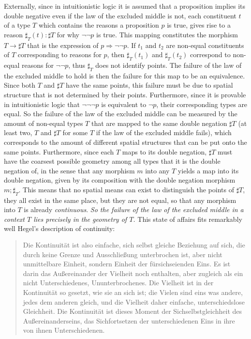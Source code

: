 \documentclass{article}
\begin{document}
Externally, since in intuitionistic logic it is assumed that a proposition implies its double negative even 
if the law of the excluded middle is not, each constituent $t$ of a type $T$ which contains the reasons a 
proposition $p$ is true, gives rise to a reason $\sharp_T (t):\sharp T$ for why $\neg\neg p$ is true. This 
mapping constitutes the morphism $T \rightarrow \sharp T$ that is the expression of $p\Rightarrow\neg\neg p$.
If $t_1$ and $t_2$ are non-equal constituents of $T$ corresponding to reasons for $p$, then $\sharp_T (t_1)$
and $\sharp_T (t_2)$ correspond to non-equal reasons for $\neg\neg p$, thus $\sharp_T$ does not identify 
points. The failure of the law of the excluded middle to hold is then the failure for this map to be an equivalence. 
Since both $T$ and $\sharp T$ have the same points, this failure must be due to spatial structure that is not
determined by their points. Furthermore, since it is provable in intuitionistic logic that $\neg\neg\neg p$ 
is equivalent to $\neg p$, their corresponding types are equal. So the failure of the law of the excluded middle
can be measured by the amount of non-equal types $T$ that are mapped to the same double negation $\sharp T$ 
(at least two, $T$ and $\sharp T$ for some $T$ if the law of the excluded middle fails), which corresponds to
the amount of different spatial structures that can be put onto the same points. Furthermore, since each 
$T$ maps to its double negation, $\sharp T$ must have the coarsest possible geometry among all types that it is the double negation of, in the sense that any morphism 
$m$ into any $T$ yields a map into its double negation,
given by its composition with the double negation morphism $m;\sharp_T$. This means that no spatial means can
exist to distinguish the points of $\sharp T$, they all exist in the same place, but they are not equal, so
that any morphism into $T$ is already \emph{continuous}. \emph{So the failure of the 
law of the excluded middle in a context $T$ lies precisely in the geometry of $T$.} This state of affairs fits remarkably well Hegel's description of continuity:

\begin{quote}
    Die Kontinuität ist also einfache, sich selbst gleiche Beziehung auf sich, die durch keine Grenze und Ausschließung unterbrochen ist, aber nicht unmittelbare Einheit, sondern Einheit der fürsichseienden Eins. Es ist darin das Außereinander der Vielheit noch enthalten, aber zugleich als ein nicht Unterschiedenes, Ununterbrochenes. Die Vielheit ist in der Kontinuität so gesetzt, wie sie an sich ist; die Vielen sind eins was andere, jedes dem anderen gleich, und die Vielheit daher einfache, unterschiedslose Gleichheit. Die Kontinuität ist dieses Moment der Sichselbstgleichheit des Außereinanderseins, das Sichfortsetzen der unterschiedenen Eins in ihre von ihnen Unterschiedenen.
\end{quote}
\end{document}
